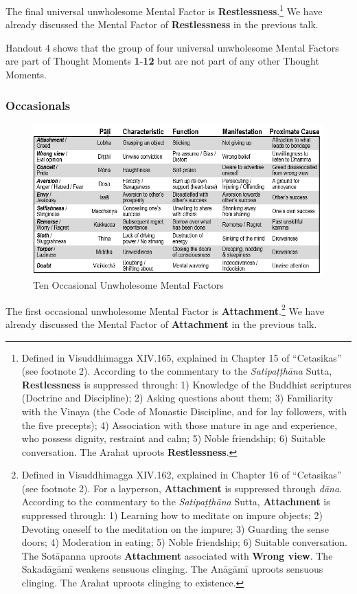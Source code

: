 The final universal unwholesome Mental Factor is \textbf{Restlessness}.\footnote{Defined in Visuddhimagga XIV.165, explained in Chapter 15 of “Cetasikas” (see footnote 2). According to the commentary to the \textit{Satipaṭṭhāna} Sutta, \textbf{Restlessness} is suppressed through: 1) Knowledge of the Buddhist scriptures (Doctrine and Discipline); 2) Asking questions about them; 3) Familiarity with the Vinaya (the Code of Monastic Discipline, and for lay followers, with the five precepts); 4) Association with those mature in age and experience, who possess dignity, restraint and calm; 5) Noble friendship; 6) Suitable conversation. The Arahat uproots \textbf{Restlessness}.} We have already discussed the Mental Factor of \textbf{Restlessness} in the previous talk.

Handout 4 shows that the group of four universal unwholesome Mental Factors are part of Thought Moments \textbf{1}-\textbf{12} but are not part of any other Thought Moments.

\subsubsection*{Occasionals}

\begin{figure}[h]
\centering
\includegraphics[width=0.8\linewidth]{./Diagrams/O-U}
\caption{Ten Occasional Unwholesome Mental Factors}
\label{fig:O-U}
\end{figure}

The first occasional unwholesome Mental Factor is \textbf{Attachment}.\footnote{Defined in Visuddhimagga XIV.162, explained in Chapter 16 of “Cetasikas” (see footnote 2). For a layperson, \textbf{Attachment} is suppressed through \textit{dāna}. According to the commentary to the \textit{Satipaṭṭhāna} Sutta, \textbf{Attachment} is suppressed through: 1) Learning how to meditate on impure objects; 2) Devoting oneself to the meditation on the impure; 3) Guarding the sense doors; 4) Moderation in eating; 5) Noble friendship; 6) Suitable conversation. The Sotāpanna uproots \textbf{Attachment} associated with \textbf{Wrong view}. The Sakadāgāmī weakens sensuous clinging. The Anāgāmī uproots sensuous clinging. The Arahat uproots clinging to existence.
} We have already discussed the Mental Factor of \textbf{Attachment} in the previous talk.

